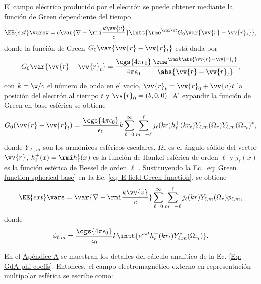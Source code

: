 El campo eléctrico producido por el electrón se puede obtener mediante la función de Green dependiente del tiempo \cite{maciel2019electromagnetic}  
\begin{equation}
\EE{ext}\varsw = e\var{\nabla-\rmi \frac{k\vv{v}}{c}} \intt{\rme^{\rmi \w t} G_0 \var{\vv{r}-\vv{r}_t}},
\label{eq: E field Green function}
\end{equation}
donde la función de Green $G_0 \var{\vv{r}-\vv{r}_t}$ está dada por 
\begin{equation}
G_0 \var{\vv{r}-\vv{r}_t} = \frac{\cgs{4\pi\epsilon_0}}{4\pi\epsilon_0}\frac{\rme^{\rmi k \abs{\vv{r}-\vv{r}_t}}}{\abs{\vv{r}-\vv{r}_t}},
\end{equation}
con $k = \w/c$ el número de onda en el vacío, $\vv{r}_t=\vv{r}_0+\vv{v}t$ la posición del electrón al tiempo $t$ y $\vv{r}_0 = (b,0,0)$. Al expandir la función de Green en base esférica se obtiene \cite{de1999relativistic}
\begin{equation}
G_0(\vv{r}-\vv{r}_t) = \frac{\cgs{4\pi\epsilon_0}}{\epsilon_0} k \sum_{\ell = 0}^{\infty} \sum_{m=-\ell}^{\ell} j_{\ell}(kr) h_{\ell}^{+}(k r_t) Y_{\ell, m}(\Omega_r) Y_{\ell, m}(\Omega_{r_t})^{*},
\label{eq: Green function spherical base}
\end{equation}
donde $Y_{\ell,m}$ son los armónicos esféricos escalares, $\Omega_r$ es el ángulo sólido del vector $\vv{r}$, $h_{\ell}^{+}(x) = \rmi h_{\ell}^{1}(x)$ es la función de Hankel esférica de orden $\ell$ y $j_{\ell}(x)$ es la función esférica de Bessel de orden $\ell$ \citep{Abramowitz}. Sustituyendo la Ec. \eqref{eq: Green function spherical base} en la Ec. \eqref{eq: E field Green function}, se obtiene
\begin{equation}
\EE{ext}\vars = \var{\nabla-\rmi \frac{k\vv{v}}{c}} \sum_{\ell = 0}^{\infty} \sum_{m=-\ell}^{\ell} j_{\ell}(kr) Y_{\ell, m}(\Omega_{r})\phi_{\ell, m},
\end{equation}
donde 
\begin{equation}
\phi_{\ell, m} = \frac{\cgs{4\pi\epsilon_0}}{\epsilon_0} k \intt{e^{i \omega t} h_{\ell}^{+}(k r_{t}) Y_{\ell, m}^{*}(\Omega_{r_t}) }.
\label{Eq: GdA phi coeffs}
\end{equation}

En el \hyperref[AppendixScalarPotentials]{Apéndice A} se muestran los detalles del cálculo analítico de la Ec. \eqref{Eq: GdA phi coeffs}. Entonces, el campo electromagnético externo en representación multipolar esférica se escribe como:

